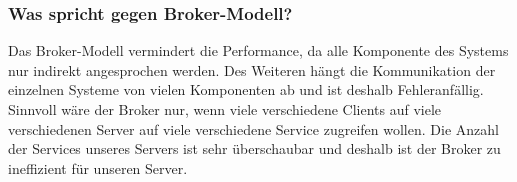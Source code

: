 \subsubsection{Was spricht gegen Broker-Modell?}
Das Broker-Modell vermindert die Performance, da alle Komponente des Systems nur indirekt angesprochen werden. Des Weiteren hängt die Kommunikation der einzelnen Systeme von vielen Komponenten ab und ist deshalb Fehleranfällig.
Sinnvoll wäre der Broker nur, wenn viele verschiedene Clients auf viele verschiedenen Server auf viele verschiedene Service zugreifen wollen. Die Anzahl der Services unseres Servers ist sehr überschaubar und deshalb ist der Broker zu ineffizient für unseren Server.